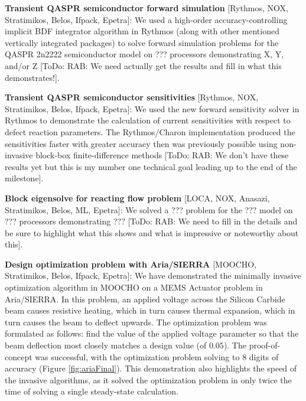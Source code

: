 \documentclass[pdf,ps2pdf,11pt]{SANDreport}
\begin{document}

{}\noindent\textbf{Transient QASPR semiconductor forward simulation} [Rythmos,
NOX, Stratimikos, Belos, Ifpack, Epetra]: We used a high-order
accuracy-controlling implicit BDF integrator algorithm in Rythmos (along with
other mentioned vertically integrated packages) to solve forward simulation
problems for the QASPR 2n2222 semiconductor model on ??? processors
demonstrating X, Y, and/or Z [ToDo: RAB: We need actually get the results and
fill in what this demonstrates!].


{}\noindent\textbf{Transient QASPR semiconductor sensitivities} [Rythmos, NOX,
Stratimikos, Belos, Ifpack, Epetra]: We used the new forward sensitivity
solver in Rythmos to demonstrate the calculation of current sensitivities with
respect to defect reaction parameters.  The Rythmos/Charon implementation
produced the sensitivities faster with greater accuracy then was previously
possible using non-invasive block-box finite-difference methods [ToDo: RAB: We
don't have these results yet but this is my number one technical goal leading
up to the end of the milestone].



{}\noindent\textbf{Block eigensolve for reacting flow problem} [LOCA, NOX,
Anasazi, Stratimikos, Belos, ML, Epetra]: We solved a ??? problem for the ???
model on ??? processors demonstrating ??? [ToDo: RAB: We need to fill in the
details and be sure to highlight what this shows and what is impressive or
noteworthy about this].

{}\noindent\textbf{Design optimization problem with Aria/SIERRA} [MOOCHO,
Stratimikos, Belos, Ifpack, Epetra]: We have demonstrated the minimally
invasive optimization algorithm in MOOCHO on a MEMS Actuator problem in
Aria/SIERRA.  In this problem, an applied voltage across the Silicon Carbide
beam causes resistive heating, which in turn causes thermal expansion, which
in turn causes the beam to deflect upwards. The optimization problem was
formulated as follows: find the value of the applied voltage parameter so that
the beam deflection most closely matches a design value (of $0.05$). The
proof-of-concept was successful, with the optimization problem solving to $8$
digits of accuracy (Figure {}\ref{fig:ariaFinal}). This demonstration also
highlights the speed of the invasive algorithms, as it solved the optimization
problem in only twice the time of solving a single steady-state calculation.
\end{document}
